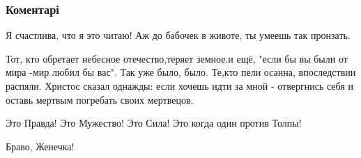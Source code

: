  
 
 
 
 
\subsubsection{Коментарі}

\begin{itemize}
 
Я счастлива, что я это читаю! Аж до бабочек в животе, ты умеешь так пронзать.

 

Тот, кто обретает небесное отечество,теряет земное.и ещё, "если бы вы были от
мира -мир любил бы вас". Так уже было, было. Те,кто пели осанна, впоследствии
распяли. Христос сказал однажды: если хочешь идти за мной - отвергнись себя и
оставь мертвым погребать своих мертвецов.


 
Это Правда! Это Мужество! Это Сила! Это когда один против Толпы!

 
Браво, Женечка!

 


\end{itemize}
